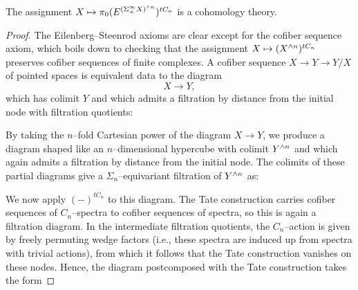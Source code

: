 \begin{lemma}\label{TateConstructionIsACohomThy}
The assignment $X \mapsto \pi_0 (E^{(\Sigma^\infty_+ X)^{\wedge n}})^{tC_n}$ is a cohomology theory.
\end{lemma}
\begin{proof}
The Eilenberg--Steenrod axioms are clear except for the cofiber sequence axiom, which boils down to checking that the assignment $X \mapsto (X^{\wedge n})^{tC_n}$ preserves cofiber sequences of finite complexes.  A cofiber sequence $X \to Y \to Y/X$ of pointed spaces is equivalent data to the diagram \[X \to Y,\] which has colimit $Y$ and which admits a filtration by distance from the initial node with filtration quotients:
\begin{center}
\end{center}
By taking the $n$--fold Cartesian power of the diagram $X \to Y$, we produce a diagram shaped like an $n$--dimensional hypercube with colimit $Y^{\wedge n}$ and which again admits a filtration by distance from the initial node.  The colimits of these partial diagrams give a $\Sigma_n$--equivariant filtration of $Y^{\wedge n}$ as:
\begin{center}
\end{center}
We now apply $(-)^{tC_n}$ to this diagram.  The Tate construction carries cofiber sequences of $C_n$--spectra to cofiber sequences of spectra, so this is again a filtration diagram.  In the intermediate filtration quotients, the $C_n$--action is given by freely permuting wedge factors (i.e., these spectra are induced up from spectra with trivial actions), from which it follows that the Tate construction vanishes on these nodes.  Hence, the diagram postcomposed with the Tate construction takes the form

\end{proof}
